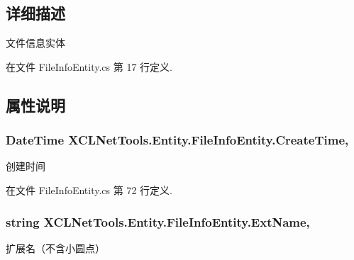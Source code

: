 \subsection{详细描述}
文件信息实体 



在文件 File\-Info\-Entity.\-cs 第 17 行定义.



\subsection{属性说明}
\hypertarget{class_x_c_l_net_tools_1_1_entity_1_1_file_info_entity_a93fc7b2a3119885d9449d1817e7306ca}{
\subsubsection[{Create\-Time}]{\setlength{\rightskip}{0pt plus 5cm}Date\-Time X\-C\-L\-Net\-Tools.\-Entity.\-File\-Info\-Entity.\-Create\-Time\hspace{0.3cm}{\ttfamily [get]}, {\ttfamily [set]}}}\label{class_x_c_l_net_tools_1_1_entity_1_1_file_info_entity_a93fc7b2a3119885d9449d1817e7306ca}


创建时间 



在文件 File\-Info\-Entity.\-cs 第 72 行定义.

\hypertarget{class_x_c_l_net_tools_1_1_entity_1_1_file_info_entity_a46ccaf5dbcc1154782c0227c83eb54e4}{
\subsubsection[{Ext\-Name}]{\setlength{\rightskip}{0pt plus 5cm}string X\-C\-L\-Net\-Tools.\-Entity.\-File\-Info\-Entity.\-Ext\-Name\hspace{0.3cm}{\ttfamily [get]}, {\ttfamily [set]}}}\label{class_x_c_l_net_tools_1_1_entity_1_1_file_info_entity_a46ccaf5dbcc1154782c0227c83eb54e4}


扩展名（不含小圆点） 



